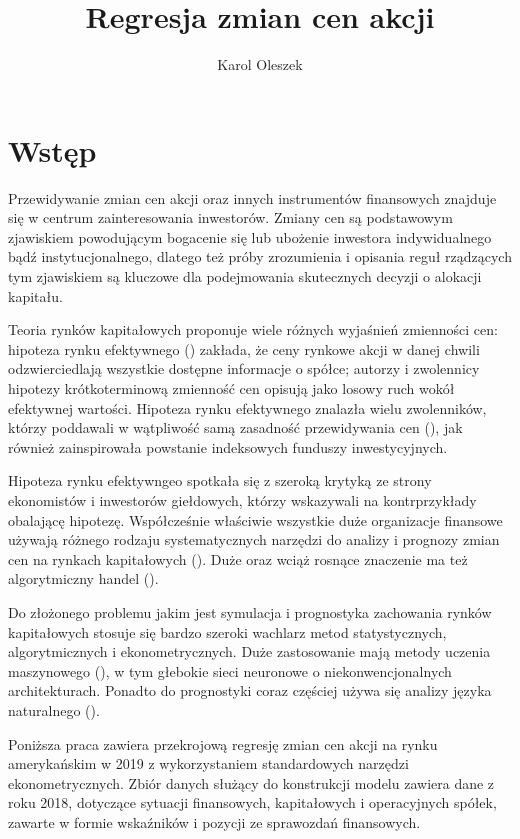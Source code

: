 \documentclass{article}
\begin{document}
\title{Regresja zmian cen akcji}
\author{Karol Oleszek}

\maketitle
\newpage
\tableofcontents

\newpage
\section{Wstęp}
Przewidywanie zmian cen akcji oraz innych instrumentów finansowych znajduje się w centrum zainteresowania inwestorów. Zmiany cen są podstawowym zjawiskiem powodującym bogacenie się lub ubożenie inwestora indywidualnego bądź instytucjonalnego, dlatego też próby zrozumienia i opisania reguł rządzących tym zjawiskiem są kluczowe dla podejmowania skutecznych decyzji o alokacji kapitału.

Teoria rynków kapitałowych proponuje wiele różnych wyjaśnień zmienności cen: hipoteza rynku efektywnego (\textcite{Bachelier1900}) zakłada, że ceny rynkowe akcji w danej chwili odzwierciedlają wszystkie dostępne informacje o spółce; autorzy i zwolennicy hipotezy krótkoterminową zmienność cen opisują jako losowy ruch wokół efektywnej wartości. Hipoteza rynku efektywnego znalazła wielu zwolenników, którzy poddawali w wątpliwość samą zasadność przewidywania cen (\textcite{Cowles1932}), jak również zainspirowała powstanie indeksowych funduszy inwestycyjnych.

Hipoteza rynku efektywngeo spotkała się z szeroką krytyką ze strony ekonomistów i inwestorów giełdowych, którzy wskazywali na kontrprzykłady obalającę hipotezę. Współcześnie właściwie wszystkie duże organizacje finansowe używają różnego rodzaju systematycznych narzędzi do analizy i prognozy zmian cen na rynkach kapitałowych (\textcite{GCM2013}). Duże oraz wciąż rosnące znaczenie ma też algorytmiczny handel (\textcite{Capgemini2012}).

Do złożonego problemu jakim jest symulacja i prognostyka zachowania rynków kapitałowych stosuje się bardzo szeroki wachlarz metod statystycznych, algorytmicznych i ekonometrycznych. Duże zastosowanie mają metody uczenia maszynowego (\textcite{ShenJiangZhang2012}), w tym głebokie sieci neuronowe o niekonwencjonalnych architekturach. Ponadto do prognostyki coraz częściej używa się analizy języka naturalnego (\textcite{WangHoLin2018}).

Poniższa praca zawiera przekrojową regresję zmian cen akcji na rynku amerykańskim w 2019 z wykorzystaniem standardowych narzędzi ekonometrycznych. Zbiór danych służący do konstrukcji modelu zawiera dane z roku 2018, dotyczące sytuacji finansowych, kapitałowych i operacyjnych spółek, zawarte w formie wskaźników i pozycji ze sprawozdań finansowych.
\end{document}
